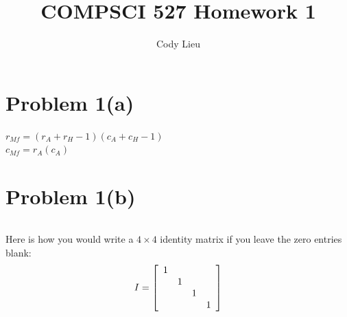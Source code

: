 \documentclass{article}
\author{Cody Lieu}
\title{COMPSCI 527 Homework 1}
\newif\ifstays
\begin{document}
\maketitle


\ifstays
\noindent [Please remove all the extra stuff below from the \verb#.tex# file before you hand in the resulting PDF file. However, please leave section headers and \verb#\newline# commands where they are. It is OK to add \verb#\newline# commands if you find that useful, but do so sparingly.

There are two ways to remove this extra stuff. One is to do so physically (look for matching \texttt{START/END}
comments), the other is to change the string \verb#\staystrue# close to the beginning of the file to \verb#\staysfalse#
\fi

\section*{Problem 1(a)}

$r_{Mf} = (r_A+r_H-1)(c_A+c_H-1)$\\
$c_{Mf} = r_A(c_A)$

\ifstays
You can say \verb#Mf# for text that looks like code, or $M_f$ for something that looks more math-like.

Keep in mind that the \verb#\verb# command lets you introduce all sorts of special characters, and so does the \verb#verbatim# environment.

The \verb#\verb# command is the only command that lets you decide what (matching) delimiters to use for its argument. You say \verb$\verb#!@%^&*(){}#$ to obtain \verb#!@%^&*(){}#, but if you want to 
include a \verb$#$ you need a different delimiter, say \verb@\verb$#$@. You can use any character you like as a delimiter, as long as it is not also inside the argument, and as long as opening and closing delimiter are the same.
\fi

\section*{Problem 1(b)}

\[
    
\]

\ifstays
Here is how you would write a $4\times 4$ identity matrix if you leave the zero entries blank:
\[
I = \left[\begin{array}{*{4}c}
 1 &  &  & \\
 & 1 &  & \\
 &  & 1 & \\
 &  &  & 1
\end{array}\right]
\]
\end{document}
